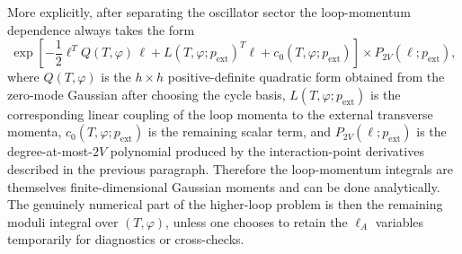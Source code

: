 \documentclass[11pt]{article}
\numberwithin{equation}{section}
\begin{document}
More explicitly, after separating the oscillator sector the loop-momentum dependence always takes the form
\begin{equation}
\label{eq:s17-004}
\exp\!\left[
-\frac12 \ell^T Q(T,\varphi)\,\ell
+L(T,\varphi;p_{\mathrm{ext}})^T\ell
+c_0(T,\varphi;p_{\mathrm{ext}})
\right]
\times
P_{2V}(\ell;p_{\mathrm{ext}}),
\end{equation}
where $Q(T,\varphi)$ is the $h\times h$ positive-definite quadratic form obtained from the zero-mode Gaussian after choosing the cycle basis, $L(T,\varphi;p_{\mathrm{ext}})$ is the corresponding linear coupling of the loop momenta to the external transverse momenta, $c_0(T,\varphi;p_{\mathrm{ext}})$ is the remaining scalar term, and $P_{2V}(\ell;p_{\mathrm{ext}})$ is the degree-at-most-$2V$ polynomial produced by the interaction-point derivatives described in the previous paragraph. Therefore the loop-momentum integrals are themselves finite-dimensional Gaussian moments and can be done analytically. The genuinely numerical part of the higher-loop problem is then the remaining moduli integral over $(T,\varphi)$, unless one chooses to retain the $\ell_A$ variables temporarily for diagnostics or cross-checks.
\end{document}
